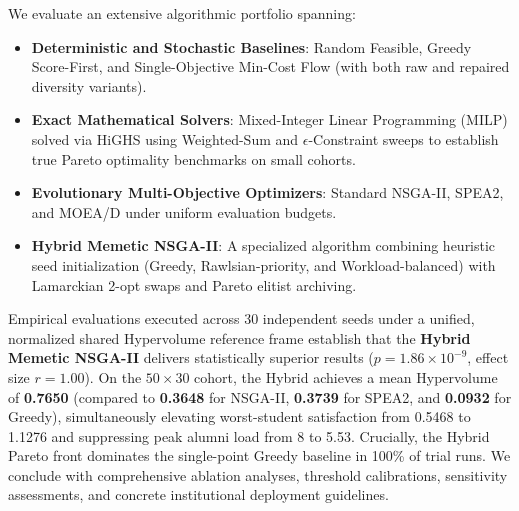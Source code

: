 \documentclass[11pt,a4paper,oneside]{report}
\begin{document}
We evaluate an extensive algorithmic portfolio spanning:
\begin{itemize}
    \item \textbf{Deterministic and Stochastic Baselines}: Random Feasible, Greedy Score-First, and Single-Objective Min-Cost Flow (with both raw and repaired diversity variants).
    \item \textbf{Exact Mathematical Solvers}: Mixed-Integer Linear Programming (MILP) solved via HiGHS using Weighted-Sum and $\epsilon$-Constraint sweeps to establish true Pareto optimality benchmarks on small cohorts.
    \item \textbf{Evolutionary Multi-Objective Optimizers}: Standard NSGA-II, SPEA2, and MOEA/D under uniform evaluation budgets.
    \item \textbf{Hybrid Memetic NSGA-II}: A specialized algorithm combining heuristic seed initialization (Greedy, Rawlsian-priority, and Workload-balanced) with Lamarckian 2-opt swaps and Pareto elitist archiving.
\end{itemize}

Empirical evaluations executed across 30 independent seeds under a unified, normalized shared Hypervolume reference frame establish that the \textbf{Hybrid Memetic NSGA-II} delivers statistically superior results ($p = 1.86 \times 10^{-9}$, effect size $r = 1.00$). On the $50 \times 30$ cohort, the Hybrid achieves a mean Hypervolume of \textbf{0.7650} (compared to \textbf{0.3648} for NSGA-II, \textbf{0.3739} for SPEA2, and \textbf{0.0932} for Greedy), simultaneously elevating worst-student satisfaction from 0.5468 to 1.1276 and suppressing peak alumni load from 8 to 5.53. Crucially, the Hybrid Pareto front dominates the single-point Greedy baseline in 100\% of trial runs. We conclude with comprehensive ablation analyses, threshold calibrations, sensitivity assessments, and concrete institutional deployment guidelines.

\newpage
{}








\appendix




\end{document}
